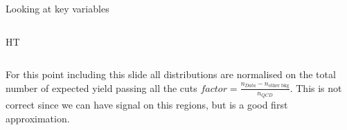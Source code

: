 \documentclass[8pt]{beamer}
\begin{document}
\begin{frame}{Looking at key variables}
\begin{columns}
\begin{block}{HT}
\end{block}

\end{columns}

\begin{block}

\tiny

For this point including this slide all distributions are normalised on the total number of expected yield passing all the cuts $factor = \frac{n_{Data}-n_{\text{other bkg}}}{n_{QCD}}$. This is not correct since
we can have signal on this regions, but is a good first approximation.

\end{block}

\end{frame}

\end{document}
